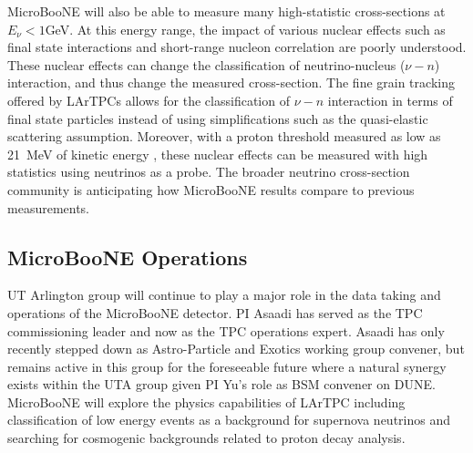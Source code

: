 MicroBooNE will also be able to measure many high-statistic cross-sections at $E_{\nu} < 1$GeV. At this energy range, the impact of various nuclear effects such as final state interactions and short-range nucleon correlation are poorly understood. These nuclear effects can change the classification of neutrino-nucleus ($\nu-n$) interaction, and thus change the measured cross-section. The fine grain tracking offered by LArTPCs allows for the classification of $\nu-n$ interaction in terms of final state particles instead of using simplifications such as the quasi-elastic scattering assumption. Moreover, with a proton threshold measured as low as 21~MeV of kinetic energy \cite{Argoneut}, these nuclear effects can be measured with high statistics using neutrinos as a probe. The broader neutrino cross-section community is anticipating how MicroBooNE results compare to previous measurements.


\subsection{MicroBooNE Operations}\label{sec:UbooneOperations}
UT Arlington group will continue to play a major role in the data taking and operations of the MicroBooNE detector. PI Asaadi has served as the TPC commissioning leader and now as the TPC operations expert. Asaadi has only recently stepped down as Astro-Particle and Exotics working group convener, but remains active in this group for the foreseeable future where a natural synergy exists within the UTA group given PI Yu's role as BSM convener on DUNE. MicroBooNE will explore the physics capabilities of LArTPC including classification of low energy events as a background for supernova neutrinos and searching for cosmogenic backgrounds related to proton decay analysis.


